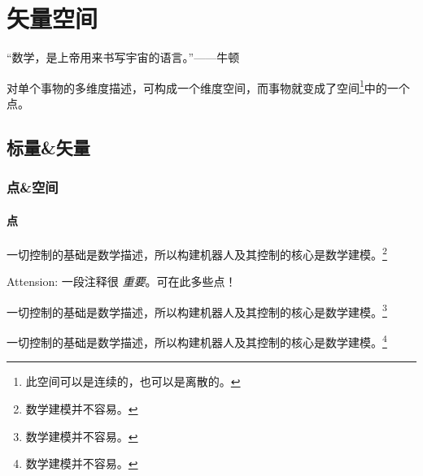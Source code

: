 \chapter{矢量空间}
\reversemarginpar %

\begin{tip} “数学，是上帝用来书写宇宙的语言。”——牛顿 \end{tip}
\begin{summary}
    对单个事物的多维度描述，可构成一个维度空间，而事物就变成了空间\footnote{此空间可以是连续的，也可以是离散的。}中的一个点。\footnotemark[1]
\end{summary}

\section{标量\&矢量}
\subsection{点\&空间}

\subsubsection{点}
{\par 一切控制的基础是数学描述，所以构建机器人及其控制的核心是数学建模。\footnote{数学建模并不容易。} }

\begin{remark}
  Attension: 一段注释很 \emph{重要}。可在此多些点！
\end{remark}

\newpage
{\par 一切控制的基础是数学描述，所以构建机器人及其控制的核心是数学建模。\footnote{数学建模并不容易。} }

\newpage
{\par 一切控制的基础是数学描述，所以构建机器人及其控制的核心是数学建模。\footnote{数学建模并不容易。} }

